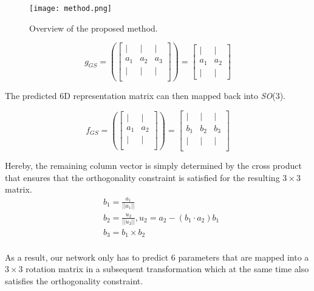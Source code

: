 \documentclass{article}
\begin{document}
\begin{figure}
    \centering
    \texttt{[image: method.png]}
    \caption{Overview of the proposed method.}
    \label{fig:method}
\end{figure}


\begin{equation}
    g_{GS}=\left( \left[ \begin{matrix}| & | & | \\ a_1 & a_2 & a_3 \\ | & | & | \\\end{matrix} \right]\right) = \left[  \begin{matrix}   | & | \\ a_1 & a_2  \\ | & |   \end{matrix}\right]
\end{equation}

The predicted 6D representation matrix can then mapped back into \textit{SO}(3).

\begin{equation}
    f_{GS}=\left( \left[\begin{matrix}| & |  \\ a_1 & a_2  \\ | & |  \\\end{matrix}  \right]\right) = \left[ \begin{matrix}| & | & | \\ b_1 & b_2 & b_3 \\ | & | & | \\\end{matrix}\right]
\end{equation}

Hereby, the remaining column vector is simply determined by the cross product that ensures that the orthogonality constraint is satisfied for the resulting $3\times3$ matrix.
\begin{equation}
\begin{split}
& b_1 = \frac{a_1}{||a_1||} \\
& b_2 = \frac{u_2}{||u_2||}, u_2=a_2-(b_1\cdot a_2)b_1\\
& b_3 = b_1\times b_2\\
\end{split}
\end{equation}

As a result, our network only has to predict 6 parameters that are mapped into a $3\times3$ rotation matrix in a subsequent transformation which at the same time also satisfies the orthogonality constraint.
\end{document}
